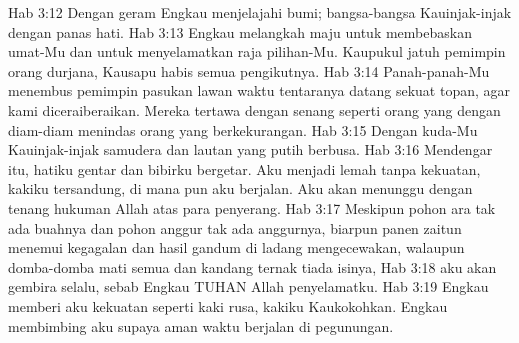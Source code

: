 Hab 3:12  Dengan geram Engkau menjelajahi bumi; bangsa-bangsa Kauinjak-injak dengan panas hati.
Hab 3:13  Engkau melangkah maju untuk membebaskan umat-Mu dan untuk menyelamatkan raja pilihan-Mu. Kaupukul jatuh pemimpin orang durjana, Kausapu habis semua pengikutnya.
Hab 3:14  Panah-panah-Mu menembus pemimpin pasukan lawan waktu tentaranya datang sekuat topan, agar kami diceraiberaikan. Mereka tertawa dengan senang seperti orang yang dengan diam-diam menindas orang yang berkekurangan.
Hab 3:15  Dengan kuda-Mu Kauinjak-injak samudera dan lautan yang putih berbusa.
Hab 3:16  Mendengar itu, hatiku gentar dan bibirku bergetar. Aku menjadi lemah tanpa kekuatan, kakiku tersandung, di mana pun aku berjalan. Aku akan menunggu dengan tenang hukuman Allah atas para penyerang.
Hab 3:17  Meskipun pohon ara tak ada buahnya dan pohon anggur tak ada anggurnya, biarpun panen zaitun menemui kegagalan dan hasil gandum di ladang mengecewakan, walaupun domba-domba mati semua dan kandang ternak tiada isinya,
Hab 3:18  aku akan gembira selalu, sebab Engkau TUHAN Allah penyelamatku.
Hab 3:19  Engkau memberi aku kekuatan seperti kaki rusa, kakiku Kaukokohkan. Engkau membimbing aku supaya aman waktu berjalan di pegunungan.


